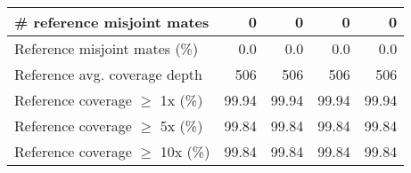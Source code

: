 \documentclass[12pt,a4paper]{article}
\begin{document}
\begin{table}[ht]
\begin{center}
\begin{tabular}{|l*{4}{|r}|}
\# reference misjoint mates & 0 & 0 & 0 & 0 \\ \hline
Reference misjoint mates (\%) & 0.0 & 0.0 & 0.0 & 0.0 \\ \hline
Reference avg. coverage depth & 506 & 506 & 506 & 506 \\ \hline
Reference coverage $\geq$ 1x (\%) & 99.94 & 99.94 & 99.94 & 99.94 \\ \hline
Reference coverage $\geq$ 5x (\%) & 99.84 & 99.84 & 99.84 & 99.84 \\ \hline
Reference coverage $\geq$ 10x (\%) & 99.84 & 99.84 & 99.84 & 99.84 \\ \hline
\end{tabular}
\end{center}
\end{table}
\end{document}
